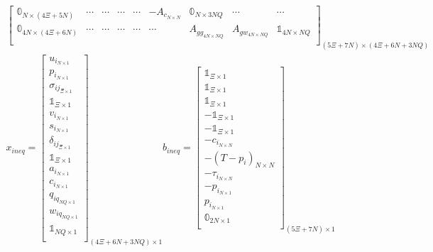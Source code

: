 \documentclass[conference]{IEEEtran}
\begin{document}
\begin{equation}
\begin{array}{c}
\begin{bmatrix}
        \mathbb{0}_{N \times (4\Xi + 5N)}   & \cdots                                    & \cdots                                    & \cdots                       & \cdots                              & -A_{c_{N \times N}}             & \mathbb{0}_{N \times 3NQ} & \cdots                & \cdots                    \\
        \mathbb{0}_{4N \times (4\Xi + 6N)}  & \cdots                                    & \cdots                                    & \cdots                       & \cdots                              & \cdots                          & A_{gg_{4N \times NQ}}     & A_{gw_{4N \times NQ}} & \mathbb{1}_{4N \times NQ} \\
    \end{bmatrix}_{(5\Xi + 7N) \times (4\Xi + 6N + 3NQ)}                                                                                                                                                                                                                                                                       \\
    x_{ineq} =
    \begin{bmatrix}
        u_{i_{N \times 1}} \\ p_{i_{N \times 1}} \\ \sigma_{ij_{\Xi \times 1}} \\ \mathbb{1}_{\Xi \times 1} \\ v_{i_{N \times 1}} \\ s_{i_{N \times 1}} \\ \delta_{ij_{\Xi \times 1}} \\ \mathbb{1}_{\Xi \times 1} \\ a_{i_{N \times 1}} \\ c_{i_{N \times 1}} \\ q_{iq_{NQ \times1}} \\w_{iq_{NQ \times 1}} \\ \mathbb{1}_{NQ \times 1} \\
    \end{bmatrix}_{(4\Xi + 6N + 3NQ) \times 1}
    b_{ineq} =
    \begin{bmatrix}
        \mathbb{1}_{\Xi \times 1} \\ \mathbb{1}_{\Xi \times 1} \\ \mathbb{1}_{\Xi \times 1} \\ -\mathbb{1}_{\Xi \times 1} \\ -\mathbb{1}_{\Xi \times 1} \\ -c_{i_{N \times N}} \\ -(T-p_i)_{N \times N} \\ -\tau_{i_{N \times N}} \\ -p_{i_{N \times 1}} \\ p_{i_{N \times 1}} \\ \mathbb{0}_{2N \times 1} \\
    \end{bmatrix}_{(5\Xi + 7N) \times 1}
\end{array}
\end{equation}\\
\normalsize
\end{document}
